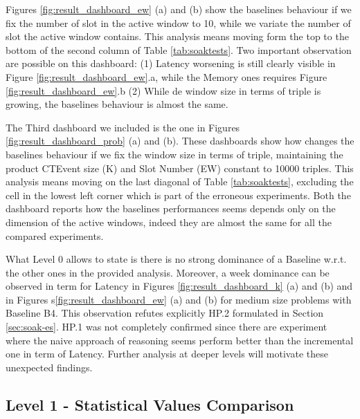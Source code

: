 Figures \ref{fig:result_dashboard_ew} (a) and (b) show the baselines behaviour if we fix the number of slot in the active window to 10, while we variate the number of slot the active window contains. This analysis means moving form the top to the bottom of the second column of Table \ref{tab:soaktests}. Two important observation are possible on this dashboard: (1) Latency worsening is still clearly visible in  Figure \ref{fig:result_dashboard_ew}.a, while the Memory ones requires Figure \ref{fig:result_dashboard_ew}.b (2) While de window size in terms of triple is growing, the baselines behaviour is almost the same. 

The Third dashboard we included is the one in Figures \ref{fig:result_dashboard_prob} (a) and (b). These dashboards show how changes the baselines behaviour if we fix the window size in terms of triple, maintaining the product CTEvent size (K) and Slot Number (EW) constant to 10000 triples.
This analysis means moving on the last diagonal of Table \ref{tab:soaktests}, excluding the cell in the lowest left corner which is part of the erroneous experiments. Both the dashboard reports how the baselines performances seems depends only on the dimension of the active windows, indeed they are almost the same for all the compared experiments.

What Level 0 allows to state is there is no strong dominance of a Baseline w.r.t. the other ones in the provided analysis. Moreover, a week dominance can be observed in term for Latency in Figures \ref{fig:result_dashboard_k} (a) and (b) and in Figures s\ref{fig:result_dashboard_ew} (a) and (b) for medium size problems with Baseline B4. This observation refutes explicitly HP.2 formulated in Section \ref{sec:soak-es}. HP.1 was not completely confirmed since there are experiment where the naive approach of reasoning seems perform better than the incremental one in term of Latency. Further analysis at deeper levels will motivate these unexpected findings.

\subsection{Level 1 -  Statistical Values Comparison}

